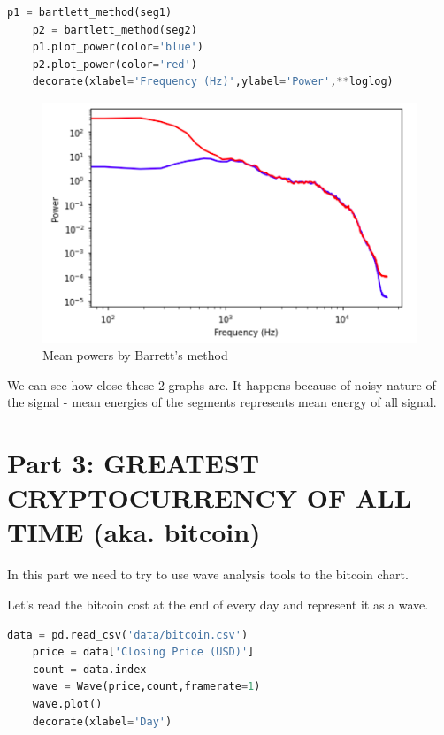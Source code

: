 \documentclass[a4paper]{article}
\begin{document}
        \begin{lstlisting}[language=Python,caption=Sawtooth wave plot code,label={lst:sawtooth_check}]
    p1 = bartlett_method(seg1)
    p2 = bartlett_method(seg2)
    p1.plot_power(color='blue')
    p2.plot_power(color='red')
    decorate(xlabel='Frequency (Hz)',ylabel='Power',**loglog)
        \end{lstlisting}

        \begin{figure}[H]
          \centering
          \includegraphics[width=\textwidth]{img/seg_barrett.png}
          \caption{Mean powers by Barrett's method}
          \label{fig:sawtooth_wave_plot}
        \end{figure}
            
        We can see how close these 2 graphs are. It happens because of noisy nature of the signal - mean energies of the segments represents mean energy of all signal.
        
    \newpage
        \section{Part 3: GREATEST CRYPTOCURRENCY OF ALL TIME (aka. bitcoin)}
            
        In this part we need to try to use wave analysis tools to the bitcoin chart.
        
        Let's read the bitcoin cost at the end of every day and represent it as a wave. 
        
        \begin{lstlisting}[language=Python,caption=Bitcoin to a wave,label={lst:als_sqr}]
    data = pd.read_csv('data/bitcoin.csv')
    price = data['Closing Price (USD)']
    count = data.index
    wave = Wave(price,count,framerate=1)
    wave.plot()
    decorate(xlabel='Day')
        \end{lstlisting}
            
\end{document}
